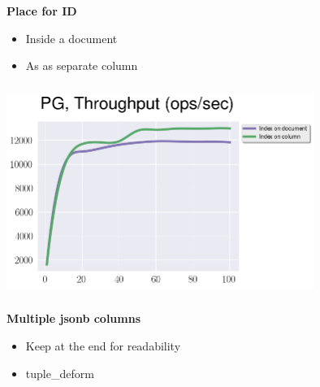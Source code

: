 \documentclass[usenames,dvipsnames, 18pt, compress, aspectratio=169]{beamer}
\begin{document}
\begin{frame}
    \frametitle{}
    \begin{center}
    \textbf{Place for ID}

        \begin{itemize}[label={\MVRightarrow}]
            \item Inside a document
            \item As as separate column
        \end{itemize}

    \end{center}
\end{frame}

\begin{frame}
    \frametitle{}
    \begin{center}

        \includegraphics[width=0.75\textwidth,center]{pg_id_place.png}

    \end{center}
\end{frame}

\begin{frame}
    \frametitle{}
    \begin{center}
        \textbf{Multiple jsonb columns}

        \begin{itemize}[label={\MVRightarrow}]
            \item Keep at the end for readability
            \item tuple\_deform
        \end{itemize}

    \end{center}
\end{frame}
\end{document}
